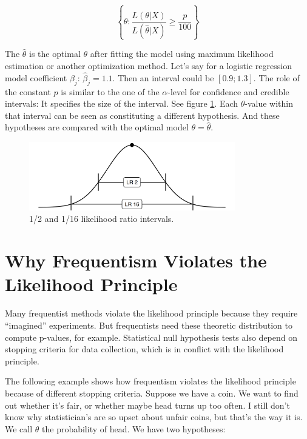 \documentclass[
  10pt,
]{scrbook}
\begin{document}
\[\left\{\theta: \frac{L(\theta| X)}{L(\hat{\theta}| X)} \geq \frac{p}{100}\right\}\]

The \(\hat{\theta}\) is the optimal \(\theta\) after fitting the model using maximum likelihood estimation or another optimization method.
Let's say for a logistic regression model coefficient \(\beta_j\): \(\hat{\beta}_j = 1.1\).
Then an interval could be \([0.9; 1.3]\).
The role of the constant \(p\) is similar to the one of the \(\alpha\)-level for confidence and credible intervals:
It specifies the size of the interval.
See figure \ref{fig:likelihood-interval}.
Each \(\theta\)-value within that interval can be seen as constituting a different hypothesis.
And these hypotheses are compared with the optimal model \(\theta = \hat{\theta}\).

\begin{figure}

{\centering \includegraphics[width=0.8\textwidth]{figures/likelihood-interval-1} 

}

\caption{1/2 and 1/16 likelihood ratio intervals.}\label{fig:likelihood-interval}
\end{figure}

\hypertarget{why-frequentism-violates-the-likelihood-principle}{%
\section{Why Frequentism Violates the Likelihood Principle}\label{why-frequentism-violates-the-likelihood-principle}}

Many frequentist methods violate the likelihood principle because they require ``imagined'' experiments.
But frequentists need these theoretic distribution to compute p-values, for example.
Statistical null hypothesis tests also depend on stopping criteria for data collection, which is in conflict with the likelihood principle.

The following example shows how frequentism violates the likelihood principle because of different stopping criteria.
Suppose we have a coin.
We want to find out whether it's fair, or whether maybe head turns up too often.
I still don't know why statistician's are so upset about unfair coins, but that's the way it is.
We call \(\theta\) the probability of head.
We have two hypotheses:
\end{document}
